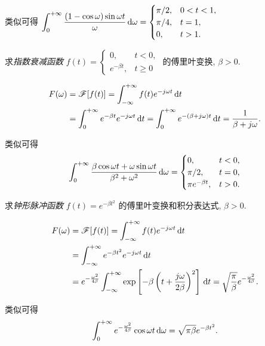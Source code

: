 \documentclass[nocolor,theme=doremi,lang=cn,11pt,chinese,twoside,openright,usesamecnt]{elegantbook}
\begin{document}
类似可得
$\displaystyle\int_0^{+\infty}\frac{(1-\cos\omega)\sin\omega t}\omega\,\mathrm{d}\omega=
	\begin{cases}
		\pi/2,&0<t<1,\\
		\pi/4,&t=1,\\
		0,&t>1.
	\end{cases}$

\begin{example}
	求\emph{指数衰减函数} $f(t)=
		\begin{cases}
			0,&t<0,\\
			e^{-\beta t},&t\ge 0
		\end{cases}$ 的傅里叶变换, $\beta>0$.
\end{example}
\begin{solution}
	\begin{align*}
		F(\omega)&=\mathscr{F}[f(t)]=\int_{-\infty}^{+\infty}f(t)e^{-j\omega t}\,\mathrm{d} t\\
		&=\int_0^{+\infty}e^{-\beta t}e^{-j\omega t}\,\mathrm{d} t
			=\int_0^{+\infty}e^{-(\beta+j\omega)t}\,\mathrm{d} t
			=\frac1{\beta+j\omega}.
	\end{align*}
\end{solution}

类似可得
	\[\int_0^{+\infty}\frac{\beta\cos\omega t+\omega\sin\omega t}{\beta^2+\omega^2}\,\mathrm{d}\omega
	=\begin{cases}
		0,&t<0,\\
		\pi/2,&t=0,\\
		\pi e^{-\beta t},&t>0.
	\end{cases}\]

\begin{example}
	求\emph{钟形脉冲函数} $f(t)=e^{-\beta t^2}$ 的傅里叶变换和积分表达式, $\beta>0$.
\end{example}

\begin{solution}
	\begin{align*}
		F(\omega)&=\mathscr{F}[f(t)]=\int_{-\infty}^{+\infty}f(t)e^{-j\omega t}\,\mathrm{d} t\\
		&=\int_{-\infty}^{+\infty}e^{-\beta t^2}e^{-j\omega t}\,\mathrm{d} t\\
		&=e^{-\frac{\omega^2}{4\beta}}\int_{-\infty}^{+\infty}\exp\left[-\beta\left(t+\frac{j\omega}{2\beta}\right)^2\right]\,\mathrm{d} t
			=\sqrt{\frac\pi\beta}e^{-\frac{\omega^2}{4\beta}}.
	\end{align*}
\end{solution}

类似可得
	\[\int_0^{+\infty}e^{-\frac{\omega^2}{4\beta}}\cos\omega t\,\mathrm{d}\omega=\sqrt{\pi\beta}e^{-\beta t^2}.\]
\end{document}
